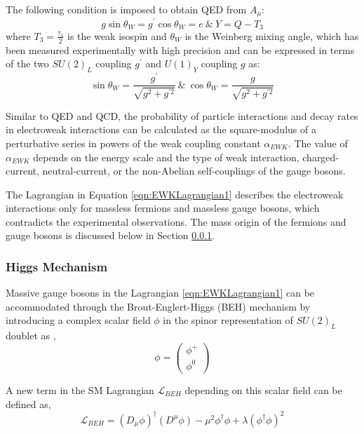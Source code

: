The following condition is imposed to obtain QED from $A_{\mu}$:
\begin{equation}
g \sin\theta_{W} = g^{'} \cos\theta_{W} = e ~\& ~  Y= Q - T_{3}
\label{eqn:QEDFromEWk}
\end{equation}
where $T_{3}=\frac{\tau_{3}}{2}$ is the weak isospin and $\theta_{W}$ is the Weinberg mixing angle, which has been measured experimentally with high precision and can be expressed in terms of the two $SU(2)_{L}$ coupling $g^{'}$ and $U(1)_{Y}$ coupling $g$ as:
\begin{equation}
\sin\theta_{W} = \frac{g^{'}}{\sqrt{g^{2} +  g^{'2} }} ~\&~ \cos\theta_{W} = \frac{g}{\sqrt{g^{2} +  g^{'2} }}
\label{eqn:WeinbergAngle}
\end{equation}

Similar to QED and QCD, the probability of particle interactions and decay rates in electroweak interactions can be calculated as the square-modulus of a perturbative series in powers of the weak coupling constant $\alpha _{EWK}$. The value of $\alpha _{EWK}$ depends on the energy scale and the type of weak interaction, charged-current, neutral-current, or the non-Abelian self-couplings of the gauge bosons. 

The Lagrangian in Equation \ref{eqn:EWKLagrangian1} describes the electroweak interactions only for massless fermions and massless gauge bosons, which contradicts the experimental observations. The mass origin of the fermions and gauge bosons is discussed below in Section \ref{subsubsec:HiggsMech}. 

\subsubsection{Higgs Mechanism}
\label{subsubsec:HiggsMech}

Massive gauge bosons in the Lagrangian \ref{eqn:EWKLagrangian1} can be accommodated through the Brout-Englert-Higgs (BEH) mechanism by introducing a complex scalar field $\phi$ in the spinor representation of $SU(2)_{L}$ doublet as \cite{HiggsMechanism},
\begin{equation}
\phi = \begin{pmatrix} \phi^{+} \\ \phi^{0} \end{pmatrix}
\end{equation}

A new term in the SM Lagrangian $\mathcal{L}_{BEH}$ depending on this scalar field can be defined as, 
\begin{equation}
\mathcal{L}_{BEH}  = (D_{\mu} \phi)^{\dagger} ( D^{\mu} \phi) - \mu^2 \phi^{\dagger} \phi + \lambda (\phi^{\dagger} \phi)^2
\label{eqn:LagBEH}
\end{equation}


